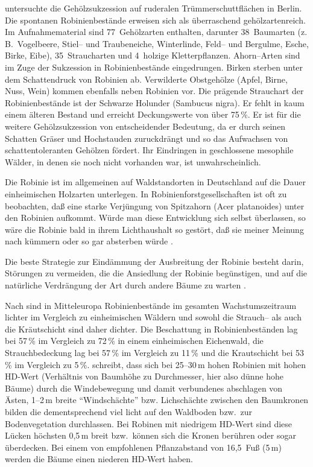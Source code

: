 \documentclass[twocolumn]{scrartcl}
\begin{document}
\citet{kowarik1990robinie} untersuchte die Gehölzsukzession auf
ruderalen Trümmerschuttflächen in Berlin. Die spontanen
Robinienbestände erweisen sich als überraschend gehölzartenreich. Im
Aufnahmematerial sind 77~Gehölzarten enthalten, darunter 38~Baumarten
(z.\,B.\ Vogelbeere, Stiel-- und Traubeneiche, Winterlinde, Feld-- und
Bergulme, Esche, Birke, Eibe), 35~Straucharten und 4~holzige
Kletterpflanzen. Ahorn--Arten sind im Zuge der Sukzession in
Robinienbestände eingedrungen. Birken sterben unter dem Schattendruck
von Robinien ab. Verwilderte Obstgehölze (Apfel, Birne, Nuss, Wein)
kommen ebenfalls neben Robinien vor. Die prägende Strauchart der
Robinienbestände ist der Schwarze Holunder (Sambucus nigra). Er fehlt
in kaum einem älteren Bestand und erreicht Deckungswerte von über
75\,\%. Er ist für die weitere Gehölzsukzession von entscheidender
Bedeutung, da er durch seinen Schatten Gräser und Hochstauden
zuruckdrängt und so das Aufwachsen von schattentoleranten Gehölzen
fördert. Ihr Eindringen in geschlossene mesophile Wälder, in denen sie
noch nicht vorhanden war, ist unwahrscheinlich.

Die Robinie ist im allgemeinen auf Waldstandorten in Deutschland auf
die Dauer einheimischen Holzarten unterlegen. In
Robinienforstgesellschaften ist oft zu beobachten, daß eine starke
Verjüngung von Spitzahorn (Acer platanoides) unter den Robinien
aufkommt. Würde man diese Entwicklung sich selbst überlassen, so wäre
die Robinie bald in ihrem Lichthaushalt so gestört, daß sie meiner
Meinung nach kümmern oder so gar absterben würde
\citep{kohler1963robinie}.

Die beste Strategie zur Eindämmung der Ausbreitung der Robinie besteht
darin, Störungen zu vermeiden, die die Ansiedlung der Robinie
begünstigen, und auf die natürliche Verdrängung der Art durch andere
Bäume zu warten \citep{motta2009robinieBekaempfung}.

Nach \citet{hanzelka2015robinie} sind in Mitteleuropa Robinienbestände
im gesamten Wachstumszeitraum lichter im Vergleich zu einheimischen
Wäldern und sowohl die Strauch-- als auch die Kräutschicht sind daher
dichter. Die Beschattung in Robinienbeständen lag bei 57\,\% im
Vergleich zu 72\,\% in einem einheimischen Eichenwald, die
Strauchbedeckung lag bei 57\,\% im Vergleich zu 11\,\% und die
Krautschicht bei 53\,\% im Vergleich zu 5\,\%.
\citet[S.~47]{bluemke1955robinie} schreibt, dass sich bei 25--30\,m
hohen Robinien mit hohen HD-Wert
(Verhältnis von Baumhöhe zu Durchmesser, hier also dünne hohe Bäume)
durch die Windebewegung und damit
verbundenes abschlagen von Ästen, 1--2\,m breite \enquote{Windschächte}
bzw. Lichschächte zwischen den Baumkronen bilden die dementsprechend
viel licht auf den Waldboden bzw.\ zur Bodenvegetation durchlassen.
Bei Robinen mit niedrigem HD-Wert sind diese Lücken höchsten 0,5\,m
breit bzw.\ können sich die Kronen berühren oder sogar überdecken.
Bei einem von \cite{jessup1791robinie} empfohlenen Pflanzabstand
von 16,5~Fuß (5\,m) werden die Bäume einen niederen HD-Wert haben.
\end{document}
